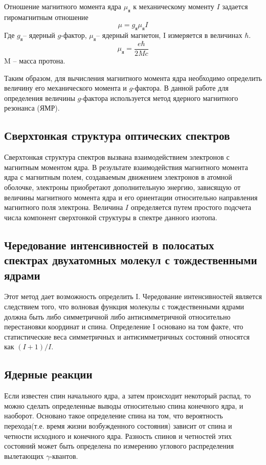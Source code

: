 \documentclass[a4paper, 12pt]{article}%
\begin{document}
Отношение магнитного момента ядра $\mu_{\text{я}}$ к механическому моменту $I$ задается гиромагнитным отношение
\[\mu=g_{\text{я}}\mu_{\text{я}}I\]
Где $g_{\text{я}}$– ядерный $g$-фактор, $\mu_{\text{я}}$– ядерный магнетон, I измеряется в величинах $\hbar$.
\[\mu_{\text{я}} = \frac{e\hbar}{2 M c}\]
M – масса протона. 

Таким образом, для вычисления магнитного момента ядра необходимо определить величину его механического момента и $g$-фактора. В данной работе для определения величины $g$-фактора используется метод ядерного магнитного резонанса (ЯМР).

\subsection{Сверхтонкая структура оптических спектров}
Сверхтонкая структура спектров вызвана взаимодействием электронов с магнитным моментом ядра. В результате взаимодействия магнитного момента ядра с магнитным полем, создаваемым движением электронов в атомной оболочке, электроны приобретают дополнительную энергию, зависящую от величины магнитного момента ядра и его ориентации относительно направления магнитного поля электрона. Величина $I$ определяется путем простого подсчета числа компонент сверхтонкой структуры в спектре данного изотопа.
\subsection{Чередование интенсивностей в полосатых спектрах двухатомных молекул с тождественными ядрами}
Этот метод дает возможность определить I. Чередование интенсивностей является следствием того, что волновая функция молекулы с тождественными ядрами должна быть либо симметричной либо антисимметричной относительно перестановки координат и спина. Определение I основано на том факте, что статистические веса симметричных и антисимметричных состояний относятся как $(I+1)/I$.
\subsection{Ядерные реакции}
Если известен спин начального ядра, а затем происходит некоторый распад, то можно сделать определенные выводы относительно спина конечного ядра, и наоборот. Основано такое определение спина на том, что вероятность перехода(т.е. время жизни возбужденного состояния) зависит от спина и четности исходного и конечного ядра. Разность спинов и четностей этих состояний может быть определена по измерению углового распределения вылетающих $\gamma$-квантов.
\end{document}
